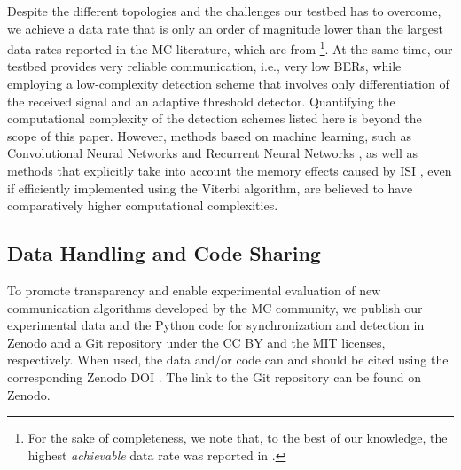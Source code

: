Despite the different topologies and the challenges our testbed has to overcome, we achieve a data rate that is only an order of magnitude lower than the largest data rates reported in the \ac{MC} literature, which are from \cite{bartunik2023development}\footnote{For the sake of completeness, we note that, to the best of our knowledge, the highest \textit{achievable} data rate was reported in \cite{huang2024non}.}. At the same time, our testbed provides very reliable communication, i.e., very low \acp{BER}, while employing a low-complexity detection scheme that involves only differentiation of the received signal and an adaptive threshold detector. Quantifying the computational complexity of the detection schemes listed here is beyond the scope of this paper. However, methods based on machine learning, such as Convolutional Neural Networks \cite{bartunik2023development} and Recurrent Neural Networks \cite{farsad2017novel}, as well as methods that explicitly take into account the memory effects caused by \ac{ISI} \cite{wang2020understanding}, even if efficiently implemented using the Viterbi algorithm, are believed to have comparatively higher computational complexities.
%
\scaleSubsection
\subsection{Data Handling and Code Sharing}\label{ssec:datasharing}
\scaleSubsectionBelow
%
To promote transparency and enable experimental evaluation of new communication algorithms developed by the \ac{MC} community, we publish our experimental data and the Python code for synchronization and detection in Zenodo and a Git repository under the CC BY and the MIT licenses, respectively. When used, the data and/or code can and should be cited using the corresponding Zenodo \ac{DOI} \cite{scherer2025Zenodo}. The link to the Git repository can be found on Zenodo.
